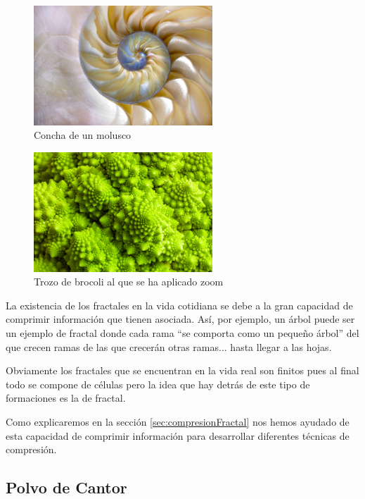 \begin{figure}[hbtp]
\centering
\includegraphics[width = 0.6\textwidth]{img/concha.jpg}
\caption{Concha de un molusco}
\label{fig:concha}
\end{figure}

\begin{figure}[hbtp]
\centering
\includegraphics[width = 0.6\textwidth]{img/brocoli.jpg}
\caption{Trozo de brocoli al que se ha aplicado zoom}
\label{fig:brocoli}
\end{figure}

La existencia de los fractales en la vida cotidiana se debe a la gran capacidad de comprimir información que tienen asociada. Así, por ejemplo, un árbol puede ser un ejemplo de fractal donde cada rama ``se comporta como un pequeño árbol'' del que crecen ramas de las que crecerán otras ramas... hasta llegar a las hojas.

Obviamente los fractales que se encuentran en la vida real son finitos pues al final todo se compone de células pero la idea que hay detrás de este tipo de formaciones es la de fractal.

Como explicaremos en la sección \ref{sec:compresionFractal} nos hemos ayudado de esta capacidad de comprimir información para desarrollar diferentes técnicas de compresión.

\subsection{Polvo de Cantor}

